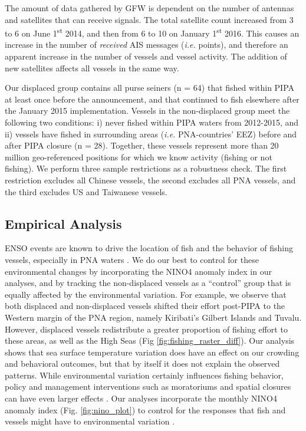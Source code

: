 \documentclass[12pt]{article}
\begin{document}
The amount of data gathered by GFW is dependent on the number of antennas and satellites that can receive signals. The total satellite count increased from 3 to 6 on June 1\textsuperscript{st} 2014, and then from 6 to 10 on January 1\textsuperscript{st} 2016. This causes an increase in the number of \emph{received} AIS messages (\emph{i.e.} points), and therefore an apparent increase in the number of vessels and vessel activity. The addition of new satellites affects all vessels in the same way.

Our displaced group contains all purse seiners (n = 64) that fished within PIPA at least once before the announcement, and that continued to fish elsewhere after the January 2015 implementation. Vessels in the non-displaced group meet the following two conditions: i) never fished within PIPA waters from 2012-2015, and ii) vessels have fished in surrounding areas (\emph{i.e.} PNA-countries' EEZ) before and after PIPA closure (n = 28). Together, these vessels represent more than 20 million geo-referenced positions for which we know activity (fishing or not fishing). We perform three sample restrictions as a robustness check. The first restriction excludes all Chinese vessels, the second excludes all PNA vessels, and the third excludes US and Taiwanese vessels.

\subsection{Empirical Analysis}

ENSO events are known to drive the location of fish and the behavior of fishing vessels, especially in PNA waters \cite{lehodey_1997,kroodsma_2018,aqorau_2018}. We do our best to control for these environmental changes by incorporating the NINO4 anomaly index in our analyses, and by tracking the non-displaced vessels as a ``control'' group that is equally affected by the environmental variation. For example, we observe that both displaced and non-displaced vessels shifted their effort post-PIPA to the Western margin of the PNA region, namely Kiribati's Gilbert Islands and Tuvalu. However, displaced vessels redistribute a greater proportion of fishing effort to these areas, as well as the High Seas (Fig \ref{fig:fishing_raster_diff}). Our analysis shows that sea surface temperature variation does have an effect on our crowding and behavioral outcomes, but that by itself it does not explain the observed patterns. While environmental variation certainly influences fishing behavior, policy and management interventions such as moratoriums and spatial closures can have even larger effects \cite{kroodsma_2018}.  Our analyses incorporate the monthly NINO4 anomaly index (Fig. \ref{fig:nino_plot}) to control for the responses that fish and vessels might have to environmental variation \cite{lehodey_1997,kroodsma_2018,aqorau_2018}.
\end{document}
